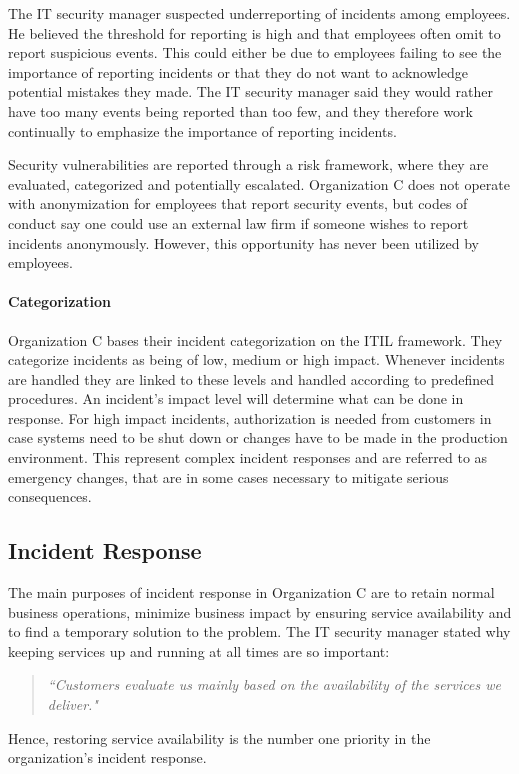 The IT security manager suspected underreporting of incidents among employees. He believed the threshold for reporting is high and that employees often omit to report suspicious events. This could either be due to employees failing to see the importance of reporting incidents or that they do not want to acknowledge potential mistakes they made. The IT security manager said they would rather have too many events being reported than too few, and they therefore work continually to emphasize the importance of reporting incidents.

Security vulnerabilities are reported through a risk framework, where they are evaluated, categorized and potentially escalated. Organization C does not operate with anonymization for employees that report security events, but codes of conduct say one could use an external law firm if someone wishes to report incidents anonymously. However, this opportunity has never been utilized by employees. 

\paragraph{Categorization}
Organization C bases their incident categorization on the ITIL framework. They categorize incidents as being of low, medium or high impact. Whenever incidents are handled they are linked to these levels and handled according to predefined procedures. An incident's impact level will determine what can be done in response. For high impact incidents, authorization is needed from customers in case systems need to be shut down or changes have to be made in the production environment. This represent complex incident responses and are referred to as emergency changes, that are in some cases necessary to mitigate serious consequences. 

\subsection{Incident Response}
The main purposes of incident response in Organization C are to retain normal business operations, minimize business impact by ensuring service availability and to find a temporary solution to the problem. The IT security manager stated why keeping services up and running at all times are so important:

\begin{quote}
\textit{``Customers evaluate us mainly based on the availability of the services we deliver."}
\end{quote}
Hence, restoring service availability is the number one priority in the organization's incident response.

